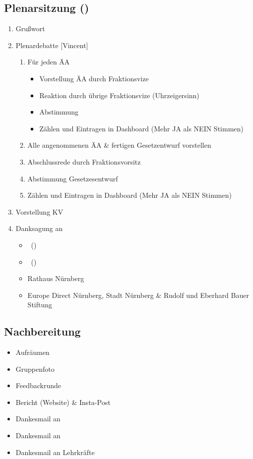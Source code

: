 \documentclass{article}
\newcommand{\EP}{Vincent}
\newcommand{\VERANSTALTUNGSORT}{Rathaus Nürnberg}%
\newcommand{\FOERDERER}{Europe Direct Nürnberg, Stadt Nürnberg \& Rudolf und Eberhard Bauer Stiftung}%
\newcommand{\VERANSTALTUNGSORT}{Landtag Bayern}%
\newcommand{\FOERDERER}{Europe Direct München, Stadt München \& Landtag Bayern}%
\begin{document}
	\subsection{Plenarsitzung (\timePlenar)}
	\begin{enumerate}
		\item Grußwort \newline
        [\stadtvertreter]
		\item Plenardebatte [\EP]
		\begin{enumerate}
			\item Für jeden ÄA
			\begin{itemize}
				\item Vorstellung ÄA durch Fraktionsvize
				\item Reaktion durch übrige Fraktionsvize (Uhrzeigersinn)
				\item Abstimmung
				\item Zählen und Eintragen in Dashboard \newline (Mehr JA als NEIN Stimmen)
			\end{itemize}
			\item Alle angenommenen ÄA \& fertigen Gesetzentwurf vorstellen
			\item Abschlussrede durch Fraktionsvorsitz
			\item Abstimmung Gesetzesentwurf
			\item Zählen und Eintragen in Dashboard (Mehr JA als NEIN Stimmen)
		\end{enumerate}
		\item Vorstellung KV
		\item Danksagung an
		\begin{itemize}
            \item \stadtvertreter\ (\stadtvertreterOffice)
			\item \politiker\ (\politikerOffice)
			\item \VERANSTALTUNGSORT
			\item \FOERDERER
		\end{itemize}
	\end{enumerate}
	
	\subsection{Nachbereitung}
	\begin{itemize}
		\item Aufräumen
		\item Gruppenfoto
		\item Feedbackrunde
		\item Bericht (Website) \& Insta-Post
		\item Dankesmail an \stadtvertreter
		\item Dankesmail an \politiker
		\item Dankesmail an Lehrkräfte
	\end{itemize}
    \newpage
\end{document}
